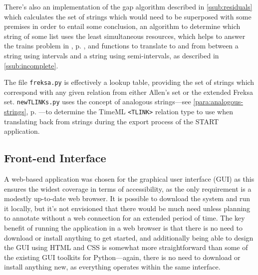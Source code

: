 \documentclass[a4paper,12pt,leqno,twoside]{article}
\begin{document}
There's also an implementation of the gap algorithm described in \cref{ssub:residuals} which calculates the set of strings which would need to be superposed with some premises in order to entail some conclusion, an algorithm to determine which string of some list uses the least simultaneous resources, which helps to answer the trains problem in , p. \pageref{tab:train-problem-clues}, and functions to translate to and from between a string using intervals and a string using semi-intervals, as described in \cref{ssub:incomplete}.

The file \verb|freksa.py| is effectively a lookup table, providing the set of strings which correspond with any given relation from either Allen's set or the extended Freksa set. \verb|newTLINKs.py| uses the concept of analogous strings---see \cref{para:analogous-strings}, p. \pageref{para:analogous-strings}---to determine the TimeML \verb|<TLINK>| relation type to use when translating back from strings during the export process of the START application.

\subsection{Front-end Interface}\label{sub:frontend}
A web-based application was chosen for the graphical user interface (GUI) as this ensures the widest coverage in terms of accessibility, as the only requirement is a modestly up-to-date web browser. It is possible to download the system and run it locally, but it's not envisioned that there would be much need unless planning to annotate without a web connection for an extended period of time. The key benefit of running the application in a web browser is that there is no need to download or install anything to get started, and additionally being able to design the GUI using HTML and CSS is somewhat more straightforward than some of the existing GUI toolkits for Python---again, there is no need to download or install anything new, as everything operates within the same interface.
\end{document}
